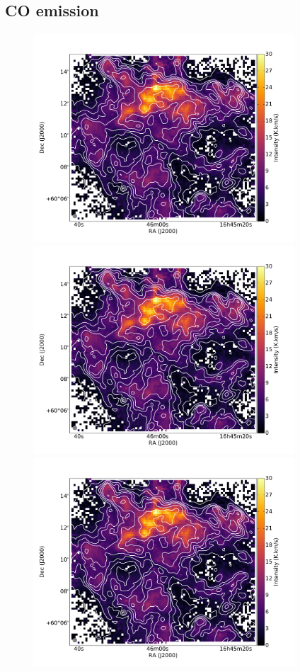 \documentclass[traditabstract]{aa}
\begin{document}
   \subsection{CO emission}

\begin{figure}[h!]
  \centering
  \includegraphics[page=1,height=7.8cm,trim=25 30 90 75,clip=true]{Figures/CO10_intensity.pdf}
  \hspace{3mm}
  \includegraphics[page=4,height=7.8cm,trim=195 30 260 75,clip=true]{Figures/CO10_intensity.pdf} \\
  \includegraphics[page=2,height=7.8cm,trim=55 30 120 75,clip=true]{Figures/CO10_intensity.pdf}

\end{figure}
\end{document}
